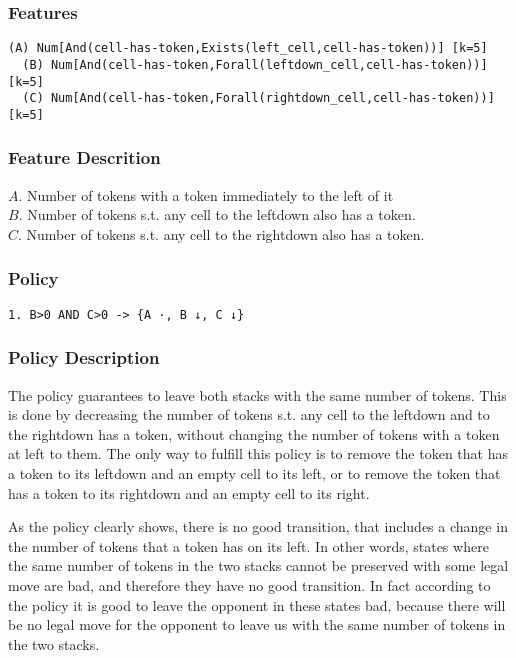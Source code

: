\documentclass[a4paper]{article}
\begin{document}
\subsubsection{Features}
\begin{Verbatim}[fontsize=\footnotesize]
  (A) Num[And(cell-has-token,Exists(left_cell,cell-has-token))] [k=5]
  (B) Num[And(cell-has-token,Forall(leftdown_cell,cell-has-token))] [k=5]
  (C) Num[And(cell-has-token,Forall(rightdown_cell,cell-has-token))] [k=5]
\end{Verbatim}

\subsubsection{Feature Descrition}
$A$. Number of tokens with a token immediately to the left of it\\
$B$. Number of tokens s.t. any cell to the leftdown also has a token.\\
$C$. Number of tokens s.t. any cell to the rightdown also has a token.

\subsubsection{Policy}
\begin{Verbatim}[fontsize=\footnotesize]
  1. B>0 AND C>0 -> {A ·, B ↓, C ↓}
\end{Verbatim}

\subsubsection{Policy Description}
The policy guarantees to leave both stacks with the same number of tokens. This is done by decreasing the number of tokens s.t. any cell to the leftdown and to the rightdown has a token, without changing the number of tokens with a token at left to them. The only way to fulfill this policy is to remove the token that has a token to its leftdown and an empty cell to its left, or to remove the token that has a token to its rightdown and an empty cell to its right.

As the policy clearly shows, there is no good transition, that includes a change in the number of tokens that a token has on its left. In other words, states where the same number of tokens in the two stacks cannot be preserved with some legal move are bad, and therefore they have no good transition. In fact according to the policy it is good to leave the opponent in these states bad, because there will be no legal move for the opponent to leave us with the same number of tokens in the two stacks.
\end{document}
